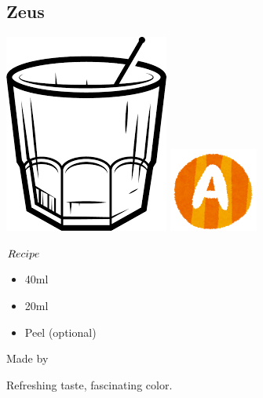 \subsection{Zeus}
\vspace{-7.6mm}
\hspace{21mm}
\includegraphics[scale=.06]{cocktail_glass_rock.png}
\includegraphics[scale=.12]{capital_a.png}
\vspace{2.5mm}
\begin{itembox}[l]{\boldmath $Recipe$}
\begin{itemize}
\setlength{\parskip}{0cm}
\setlength{\itemsep}{0cm}
\item \campari 40ml
\item \vodka 20ml
\item \lemon Peel (optional)
\end{itemize}
\vspace{-4mm}
Made by \build
\end{itembox}
Refreshing taste, fascinating color.
